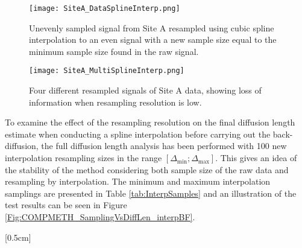 \documentclass[../../CompleteThesis/Complete_1stDraft.tex]{subfiles}
\begin{document}
\begin{figure}[h]
	\centering
	\texttt{[image: SiteA\_DataSplineInterp.png]}
	\caption{Unevenly sampled signal from Site A resampled using cubic spline interpolation to an even signal with a new sample size equal to the minimum sample size found in the raw signal.}
	\label{Fig:COMPMETH_SiteA_DataSplineInterp}
\end{figure}

\begin{figure}[h]
	\centering
	\texttt{[image: SiteA\_MultiSplineInterp.png]}
	\caption{Four different resampled signals of Site A data, showing loss of information when resampling resolution is low.}
	\label{Fig:COMPMETH_SiteA_MultiSplineInterp}
\end{figure}

To examine the effect of the resampling resolution on the final diffusion length estimate when conducting a spline interpolation before carrying out the back-diffusion, the full diffusion length analysis has been performed with 100 new interpolation resampling sizes in the range $[\Delta_{\text{min}};\Delta_{\text{max}}]$. This gives an idea of the stability of the method considering both sample size of the raw data and resampling by interpolation. The minimum and maximum interpolation samplings are presented in Table \ref{tab:InterpSamples} and an illustration of the test results can be seen in Figure \ref{Fig:COMPMETH_SamplingVsDiffLen_interpBF}.

[0.5cm]%
\end{document}
